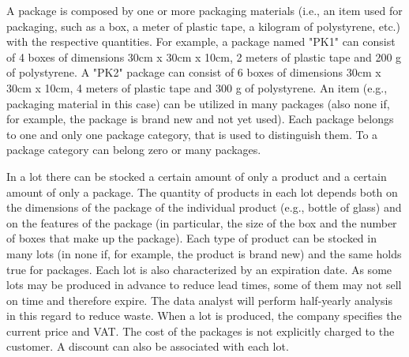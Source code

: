 A package is composed by one or more packaging materials (i.e., an item used for packaging, such as a box, a meter of plastic tape, a kilogram of polystyrene, etc.) with the respective quantities. For example, a package named "PK1" can consist of 4 boxes of dimensions 30cm x 30cm x 10cm, 2 meters of plastic tape and 200 g of polystyrene. A "PK2" package can consist of 6 boxes of dimensions 30cm x 30cm x 10cm, 4 meters of plastic tape and 300 g of polystyrene. An item (e.g., packaging material in this case) can be utilized in many packages (also none if, for example, the package is brand new and not yet used). Each package belongs to one and only one package category, that is used to distinguish them. To a package category can belong zero or many packages.

In a lot there can be stocked a certain amount of only a product and a certain amount of only a package. The quantity of products in each lot depends both on the dimensions of the package of the individual product (e.g., bottle of glass) and on the features of the package (in particular, the size of the box and the number of boxes that make up the package). Each type of product can be stocked in many lots (in none if, for example, the product is brand new) and the same holds true for packages. Each lot is also characterized by an expiration date. As some lots may be produced in advance to reduce lead times, some of them may not sell on time and therefore expire. The data analyst will perform half-yearly analysis in this regard to reduce waste. When a lot is produced, the company specifies the current price and VAT. The cost of the packages is not explicitly charged to the customer. A discount can also be associated with each lot.

